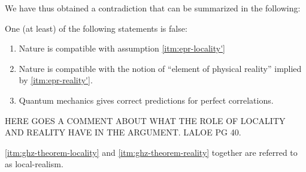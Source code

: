 We have thus obtained a contradiction that can be summarized in the following:
\begin{theorem}
  One (at least) of the following statements is false:
  \begin{enumerate}[label=(\roman*)]
  \item \label{itm:ghz-theorem-locality} Nature is compatible with assumption \ref{itm:epr-locality'}
  \item \label{itm:ghz-theorem-reality} Nature is compatible with the notion of ``element of physical reality'' implied by \ref{itm:epr-reality'}.
  \item Quantum mechanics gives correct predictions for perfect correlations.
  \end{enumerate}
\end{theorem}

\begin{observation}
  HERE GOES A COMMENT ABOUT WHAT THE ROLE OF LOCALITY AND REALITY HAVE IN THE ARGUMENT. LALOE PG 40.
\end{observation}

\begin{note}%
  \ref{itm:ghz-theorem-locality} and \ref{itm:ghz-theorem-reality} together are referred to as local-realism.
\end{note}

